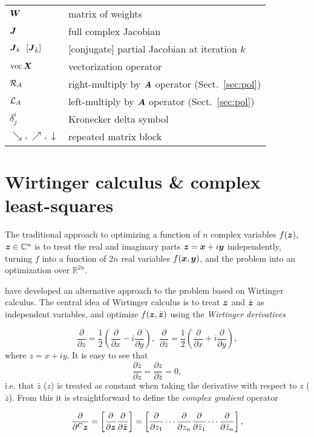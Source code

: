 \documentclass[useAMS,usenatbib]{mn2e}
\newcommand{\COMPLEX}{\mathbb{C}}
\newcommand{\REAL}{\mathbb{R}}
\newcommand{\zz}{\bmath{z}}
\newcommand{\mat}[1]{{\bmath{#1}}}
\newcommand{\JJ}{\mat{J}} %
\begin{document}
\begin{table}
\begin{tabular}{ll}
$\bmath{W}$ & matrix of weights \\
$\JJ$ & full complex Jacobian \\
$\JJ_k~~[\JJ_{\bar k}]$ & [conjugate] partial Jacobian at iteration $k$\\
$\mathrm{vec}\,\bmath{X}$ & vectorization operator \\
$\mathcal{R}_{{A}}$ & right-multiply by $\bmath{A}$ operator (Sect.~\ref{sec:pol}) \\
$\mathcal{L}_{{A}}$ & left-multiply by $\bmath{A}$ operator (Sect.~\ref{sec:pol}) \\
$\delta^i_j$ & Kronecker delta symbol \\
$\searrow,\nearrow,\downarrow$ & repeated matrix block \\
\hline



\end{tabular}
\end{table}

\section{Wirtinger calculus \& complex least-squares}
\label{sec:Wirtinger}

The traditional approach to optimizing a function of $n$ complex variables $f(\zz),$ $\zz\in\COMPLEX^n$ is
to treat the real and imaginary parts $\zz=\bmath{x}+i\bmath{y}$ independently, turning $f$ into a function
of $2n$ real variables $f(\bmath{x},\bmath{y})$, and the problem into an optimization over $\REAL^{2n}$.

\citet{ComplexOpt} have developed an alternative approach to the problem based on Wirtinger calculus. The central idea
of Wirtinger calculus is to treat $\zz$ and $\bar{\zz}$ as independent variables, and optimize $f(\zz,\bar{\zz})$
using the {\em Wirtinger derivatives} 

\[
\frac{\partial}{\partial z} = \frac{1}{2}\left ( \frac{\partial}{\partial x} - i\frac{\partial}{\partial y} \right),~~
\frac{\partial}{\partial \bar{z}} = \frac{1}{2}\left ( \frac{\partial}{\partial x} + i\frac{\partial}{\partial y} \right),
\]
where $z=x+iy$. It is easy to see that  
\[
\frac{\partial \bar z}{\partial z} = 
\frac{\partial z}{\partial \bar z} = 0,
\]
i.e. that $\bar z$ ($z$) is treated as constant when taking the derivative with respect to $z$ ($\bar z$). From this 
it is straightforward to define the \emph{complex gradient} operator 

\[
\frac{\partial}{\partial^C \zz} = \left [ \frac{\partial}{\partial \zz} \frac{\partial}{\partial \bar{\zz}} \right ] = \left [ \frac{\partial}{\partial z_1} \cdots \frac{\partial}{\partial z_n}
\frac{\partial}{\partial \bar{z}_1} \cdots \frac{\partial}{\partial \bar{z}_n} \right ],
\]
\end{document}
